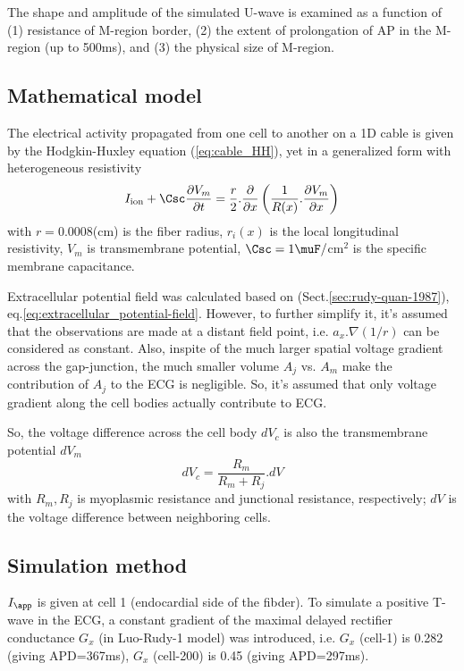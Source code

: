 The shape and amplitude of the simulated U-wave is examined as a function of (1)
resistance of M-region border, (2) the extent of prolongation of AP in the
M-region (up to 500ms), and (3) the physical size of M-region.

\subsection{Mathematical model}

The electrical activity propagated from one cell to another on a 1D cable is
given by the Hodgkin-Huxley equation (\ref{eq:cable_HH}), yet in a generalized
form with heterogeneous resistivity
\begin{equation}
I_\ion + \Csc \frac{\partial V_m}{\partial t} =
\frac{r}{2}.\frac{\partial}{\partial x}\left( \frac{1}{R(x)}.\frac{\partial
V_m}{\partial x} \right)
\end{equation}
with $r=0.0008$(cm) is the fiber radius, $r_i(x)$ is the local longitudinal
resistivity, $V_m$ is transmembrane potential, $\Csc=1\muF/$cm$^2$ is the
specific membrane capacitance.

Extracellular potential field was calculated based on \citep{rudy1987}
(Sect.\ref{sec:rudy-quan-1987}), eq.\ref{eq:extracellular_potential-field}.
However, to further simplify it, it's assumed that the observations are made at
a distant field point, i.e. $a_x.\nabla(1/r)$ can be considered as constant.
Also, inspite of the much larger spatial voltage gradient across the
gap-junction, the much smaller volume $A_j$ vs. $A_m$ make the contribution of
$A_j$ to the ECG is negligible. So, it's assumed that only voltage gradient
along the cell bodies actually contribute to ECG.

So, the voltage difference across the cell body $dV_c$ is also the transmembrane
potential $dV_m$
\begin{equation}
dV_c = \frac{R_m}{R_m+R_j} .dV
\end{equation}
with $R_m, R_j$ is myoplasmic resistance and junctional resistance,
respectively; $dV$ is the voltage difference between neighboring cells. 

\subsection{Simulation method}

$I_\app$ is given at cell 1 (endocardial side of the fibder). To simulate a
positive T-wave in the ECG, a constant gradient of the maximal delayed rectifier
conductance $G_x$ (in Luo-Rudy-1 model) was introduced, i.e. $G_x$ (cell-1) is
0.282 (giving APD=367ms), $G_x$ (cell-200) is 0.45 (giving APD=297ms).

